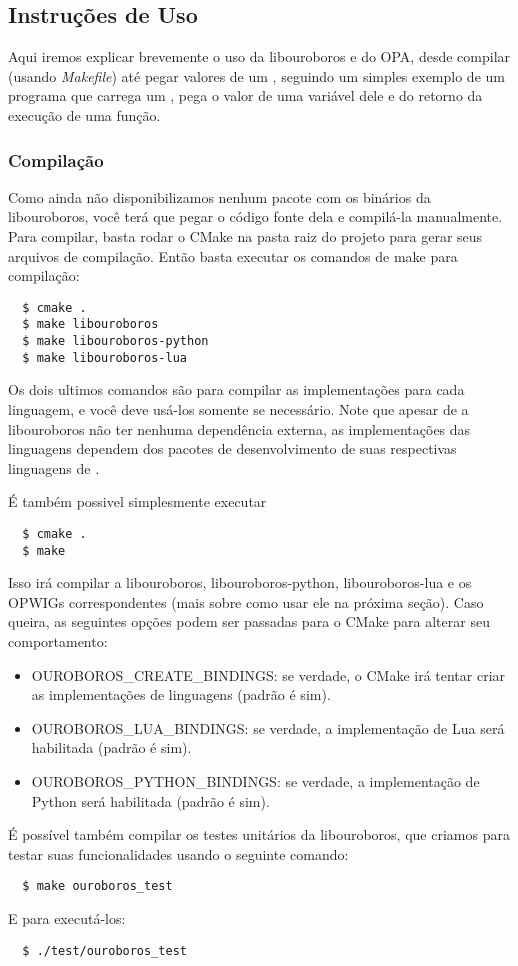 \subsection{Instruções de Uso}
Aqui iremos explicar brevemente o uso da libouroboros e do OPA, desde compilar
(usando \textit{Makefile}) até pegar valores de um \script{}, seguindo um 
simples exemplo de um programa que carrega um \script{}, pega o valor de uma
variável dele e do retorno da execução de uma função.

\subsubsection{Compilação} 
Como ainda não disponibilizamos nenhum pacote
com os binários da libouroboros, você terá que pegar o código fonte dela
e compilá-la manualmente. Para compilar, basta rodar o CMake na pasta 
raiz do projeto para gerar seus arquivos de compilação. Então basta 
executar os comandos de make para compilação:
\begin{verbatim}
  $ cmake .
  $ make libouroboros
  $ make libouroboros-python
  $ make libouroboros-lua
\end{verbatim}
Os dois ultimos comandos são para compilar as implementações para cada linguagem,
e você deve usá-los somente se necessário. Note que apesar de a libouroboros não
ter nenhuma dependência externa, as implementações das linguagens dependem dos
pacotes de desenvolvimento de suas respectivas linguagens de \script{}.

É também possivel simplesmente executar
\begin{verbatim}
  $ cmake .
  $ make
\end{verbatim}
Isso irá compilar a libouroboros, libouroboros-python, libouroboros-lua e os OPWIGs
correspondentes (mais sobre como usar ele na próxima seção). Caso queira, as
seguintes opções podem ser passadas para o CMake para alterar seu comportamento:
\begin{itemize}
  \item OUROBOROS\_CREATE\_BINDINGS: se verdade, o CMake irá tentar criar as 
    implementações de linguagens (padrão é sim).
  \item OUROBOROS\_LUA\_BINDINGS: se verdade, a implementação de Lua será habilitada (padrão é sim).
  \item OUROBOROS\_PYTHON\_BINDINGS: se verdade, a implementação de Python será habilitada (padrão é sim).
\end{itemize}

É possível também compilar os testes unitários da libouroboros, que
criamos para testar suas funcionalidades usando o seguinte comando:
\begin{verbatim}
  $ make ouroboros_test
\end{verbatim}
E para executá-los:
\begin{verbatim}
  $ ./test/ouroboros_test
\end{verbatim}
    
